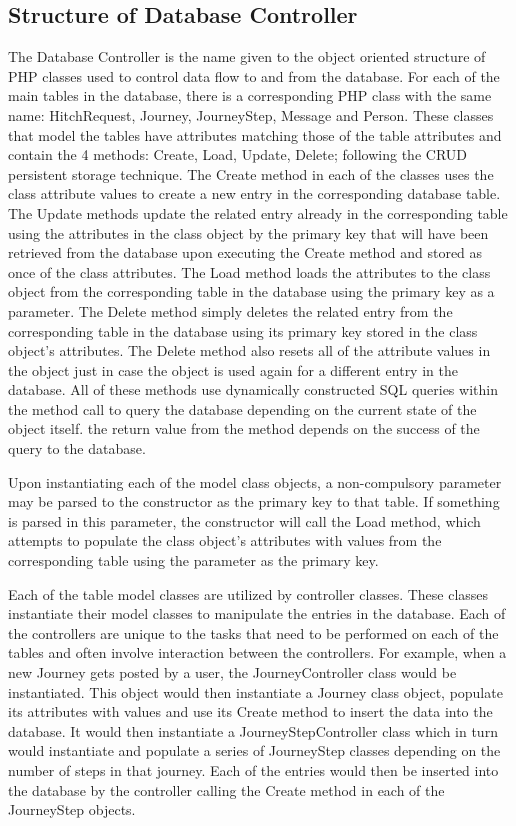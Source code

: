 	\subsection{Structure of Database Controller}
		The Database Controller is the name given to the object oriented structure of PHP classes used to control data flow to and from the database. For each of the main tables in the database, there is a corresponding PHP class with the same name: Hitch\textunderscore Request, Journey, Journey\textunderscore Step, Message and Person. These classes that model the tables have attributes matching those of the table attributes and contain the 4 methods: Create, Load, Update, Delete; following the CRUD persistent storage technique\cite{crud_technique}. The Create method in each of the classes uses the class attribute values to create a new entry in the corresponding database table. The Update methods update the related entry already in the corresponding table using the attributes in the class object by the primary key that will have been retrieved from the database upon executing the Create method and stored as once of the class attributes. The Load method loads the attributes to the class object from the corresponding table in the database using the primary key as a parameter. The Delete method simply deletes the related entry from the corresponding table in the database using its primary key stored in the class object's attributes. The Delete method also resets all of the attribute values in the object just in case the object is used again for a different entry in the database. All of these methods use dynamically constructed SQL queries within the method call to query the database depending on the current state of the object itself. the return value from the method depends on the success of the query to the database.
		
		Upon instantiating each of the model class objects, a non-compulsory parameter may be parsed to the constructor as the primary key to that table. If something is parsed in this parameter, the constructor will call the Load method, which attempts to populate the class object's attributes with values from the corresponding table using the parameter as the primary key.
		
		Each of the table model classes are utilized by controller classes. These classes instantiate their model classes to manipulate the entries in the database. Each of the controllers are unique to the tasks that need to be performed on each of the tables and often involve interaction between the controllers. For example, when a new Journey gets posted by a user, the Journey\textunderscore Controller class would be instantiated. This object would then instantiate a Journey class object, populate its attributes with values and use its Create method to insert the data into the database. It would then instantiate a Journey\textunderscore Step\textunderscore Controller class which in turn would instantiate and populate a series of Journey\textunderscore Step classes depending on the number of steps in that journey. Each of the entries would then be inserted into the database by the controller calling the Create method in each of the Journey\textunderscore Step objects. 	
				
